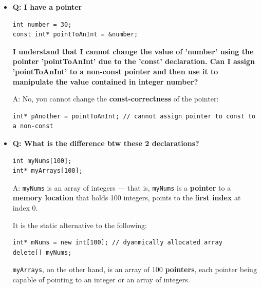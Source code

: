 \documentclass[10pt]{article}
\begin{document}
\begin{itemize}
\item \textbf{Q: I have a pointer}
	\begin{verbatim}
int number = 30;
const int* pointToAnInt = &number;
	\end{verbatim}

\textbf{I understand that I cannot change the value of 'number' using the pointer 'pointToAnInt' due to the 'const' declaration. Can I assign 'pointToAnInt' to a non-const pointer and then use it to manipulate the value contained in integer number?}

A: No, you cannot change the \textbf{const-correctness} of the pointer:
\begin{verbatim}
int* pAnother = pointToAnInt; // cannot assign pointer to const to a non-const
\end{verbatim}

\item \textbf{Q: What is the difference btw these 2 declarations?}
\begin{verbatim}
int myNums[100];
int* myArrays[100];
\end{verbatim}

A: \verb|myNums| is an array of integers --- that is, \verb|myNums| is a \textbf{pointer} to a \textbf{memory location} that holds 100 integers, points to the \textbf{first index} at index 0.

It is the static alternative to the following:

\begin{verbatim}
int* mNums = new int[100]; // dyanmically allocated array
delete[] myNums;
\end{verbatim}

\verb|myArrays|, on the other hand, is an array of 100 \textbf{pointers}, each pointer being capable of pointing to an integer or an array of integers.
\end{itemize}

\newpage
\end{document}

